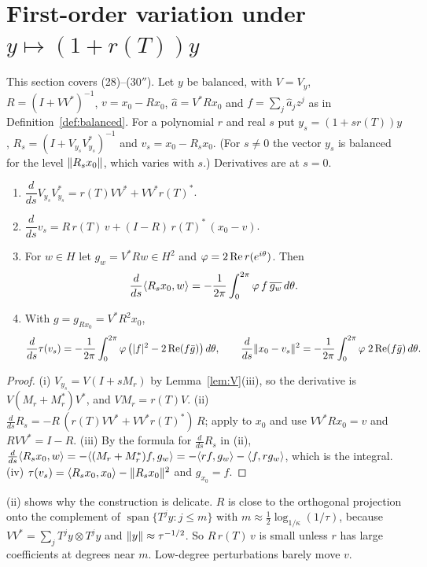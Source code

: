 \section{\texorpdfstring{First-order variation under $y\mapsto(1+r(T))y$}{First-order variation}}\label{sec:variation}

This section covers \paper{} (28)--(30$''$). Let $y$ be balanced, with $V=V_y$,
$R=(I+VV^*)^{-1}$, $v=x_0-Rx_0$, $\hat a=V^*Rx_0$ and $f=\sum_j\hat a_jz^j$ as in
Definition~\ref{def:balanced}. For a polynomial $r$ and real $s$ put $y_s=(1+sr(T))y$,
$R_s=(I+V_{y_s}V_{y_s}^*)^{-1}$ and $v_s=x_0-R_sx_0$. (For $s\ne0$ the vector $y_s$ is balanced
for the level $\lVert R_sx_0\rVert$, which varies with $s$.) Derivatives are at $s=0$.

\begin{lemma}\label{lem:variation}\stproved{}
\begin{enumerate}[label=(\roman*)]
\item $\dfrac{d}{ds}V_{y_s}V_{y_s}^*=r(T)VV^*+VV^*r(T)^*$.
\item $\dfrac{d}{ds}v_s=R\,r(T)\,v+(I-R)\,r(T)^*\,(x_0-v)$.
\item For $w\in H$ let $g_w=V^*Rw\in H^2$ and $\varphi=2\operatorname{Re} r(e^{i\theta})$. Then
\[
\frac{d}{ds}\langle R_sx_0,w\rangle=-\frac1{2\pi}\int_0^{2\pi}\varphi\,f\,\overline{g_w}\,d\theta .
\]
\item With $g=g_{Rx_0}=V^*R^2x_0$,
\[
\frac{d}{ds}\tau(v_s)=-\frac1{2\pi}\int_0^{2\pi}\varphi\,\bigl(\lvert f\rvert^2-2\operatorname{Re}(f\bar g)\bigr)\,d\theta,
\qquad
\frac{d}{ds}\lVert x_0-v_s\rVert^2=-\frac1{2\pi}\int_0^{2\pi}\varphi\;2\operatorname{Re}(f\bar g)\,d\theta .
\]
\end{enumerate}
\end{lemma}
\begin{proof}
(i) $V_{y_s}=V(I+sM_r)$ by Lemma~\ref{lem:V}(iii), so the derivative is $V(M_r+M_r^*)V^*$, and
$VM_r=r(T)V$. (ii) $\frac d{ds}R_s=-R\,(r(T)VV^*+VV^*r(T)^*)\,R$; apply to $x_0$ and use
$VV^*Rx_0=v$ and $RVV^*=I-R$. (iii) By the formula for $\frac d{ds}R_s$ in (ii),
$\frac d{ds}\langle R_sx_0,w\rangle=-\langle (M_r+M_r^*)f,g_w\rangle=-\langle rf,g_w\rangle-\langle f,rg_w\rangle$, which is the
integral. (iv) $\tau(v_s)=\langle R_sx_0,x_0\rangle-\lVert R_sx_0\rVert^2$ and $g_{x_0}=f$.
\end{proof}

\begin{remark}
(ii) shows why the construction is delicate. $R$ is close to the orthogonal projection onto the
complement of $\operatorname{span}\{T^jy:j\le m\}$ with $m\approx\frac12\log_{1/\kappa}(1/\tau)$,
because $VV^*=\sum_jT^jy\otimes T^jy$ and $\lVert y\rVert\approx\tau^{-1/2}$. So $R\,r(T)\,v$ is small
unless $r$ has large coefficients at degrees near $m$. Low-degree perturbations barely move $v$.
\end{remark}

